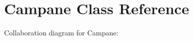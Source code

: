 \hypertarget{classcampane_1_1_campane}{}\section{Campane Class Reference}
\label{classcampane_1_1_campane}


Collaboration diagram for Campane\+:
